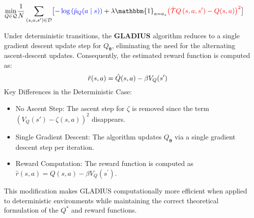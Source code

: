 \begin{align}
    \min _{Q \in \mathcal{Q}}&\frac{1}{N} \sum_{(s,a,s^\prime)\in \mathcal{D}}\bigl[\textcolor{blue}{-\log \left(\hat{p}_Q(a \mid s)\right)} + 
   \lambda\mathbbm{1}_{a=a_s}\textcolor{red}{\bigl(\hat{\mathcal{T}} Q\left(s, a, s^{\prime}\right)-Q(s, a)\bigr)^2} \bigr]\label{eq:DeterministicERMIRL}
\end{align}

\noindent Under deterministic transitions, the \textbf{GLADIUS} algorithm reduces to a single gradient descent update step for \( Q_{\boldsymbol{\theta}} \), eliminating the need for the alternating ascent-descent updates. Consequently, the estimated reward function is computed as:
\begin{equation}
    \hat{r}(s,a) = \hat{Q}(s,a) - \beta V_Q(s^\prime) \notag
\end{equation}
\noindent Key Differences in the Deterministic Case:
\begin{itemize}[leftmargin=*]
    \item No Ascent Step: The ascent step for \(\zeta\) is removed since the term \(\left(V_{Q}(s') - \zeta(s,a)\right)^2\) disappears.
    \item Single Gradient Descent: The algorithm updates \(Q_{\boldsymbol{\theta}}\) via a single gradient descent step per iteration.
    \item Reward Computation: The reward function is computed as \(\hat{r}(s, a) = \hat{Q}(s, a) - \beta V_Q(s^\prime)\).
\end{itemize}

\noindent This modification makes GLADIUS computationally more efficient when applied to deterministic environments while maintaining the correct theoretical formulation of the $Q^\ast$ and reward functions.
